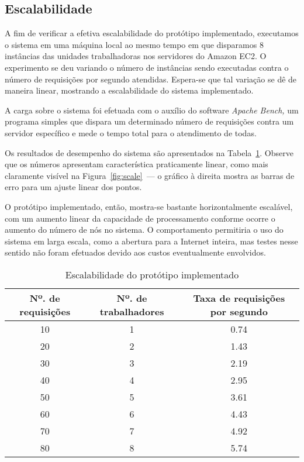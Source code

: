 \documentclass[ruledheader, 12pt]{abnt}
\newcommand{\tblref}[1]{Tabela~\ref{tbl:#1}}
\begin{document}
\subsection{Escalabilidade}

A fim de verificar a efetiva escalabilidade do protótipo implementado, executamos o sistema em uma máquina local ao mesmo tempo em que disparamos 8 instâncias das unidades trabalhadoras nos servidores do Amazon EC2. O experimento se deu variando o número de instâncias sendo executadas contra o número de requisições por segundo atendidas. Espera-se que tal variação se dê de maneira linear, mostrando a escalabilidade do sistema implementado.

A carga sobre o sistema foi efetuada com o auxílio do software \emph{Apache Bench,} um programa simples que dispara um determinado número de requisições contra um servidor específico e mede o tempo total para o atendimento de todas.

Os resultados de desempenho do sistema são apresentados na \tblref{scale}. Observe que os números apresentam característica praticamente linear, como mais claramente visível na Figura~\ref{fig:scale}~--- o gráfico à direita mostra as barras de erro para um ajuste linear dos pontos.

O protótipo implementado, então, mostra-se bastante horizontalmente escalável, com um aumento linear da capacidade de processamento conforme ocorre o aumento do número de nós no sistema. O comportamento permitiria o uso do sistema em larga escala, como a abertura para a Internet inteira, mas testes nesse sentido não foram efetuados devido aos custos eventualmente envolvidos.

\begin{table}[p]
	\centering
	\caption{\label{tbl:scale}Escalabilidade do protótipo implementado}
	\begin{tabular}{c c c}\hline
		\hline
		Nº. de requisições & Nº. de trabalhadores & Taxa de requisições por segundo \\\hline
		\hline
		10 & 1 & 0.74 \\\hline
		20 & 2 & 1.43 \\\hline
		30 & 3 & 2.19 \\\hline
		40 & 4 & 2.95 \\\hline
		50 & 5 & 3.61 \\\hline
		60 & 6 & 4.43 \\\hline
		70 & 7 & 4.92 \\\hline
		80 & 8 & 5.74 \\\hline
		\hline
	\end{tabular}
\end{table}
\end{document}
